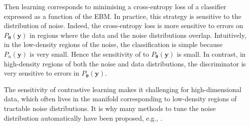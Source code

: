 Then learning corresponds to minimising a cross-entropy loss of a classifier expressed as a function of the EBM. In practice, this strategy is sensitive to the distribution of noise. Indeed, the cross-entropy loss is more sensitive to errors on $P_{\bm{\theta}}(\bm{y})$ in regions where the data and the noise distributions overlap. Intuitively, in the low-density regions of the noise, the classification is simple because $P_n(\mathbf{y})$ is very small. Hence the sensitivity of  to $P_{\bm{\theta}}(\bm{y})$ is small. In contrast, in high-density regions of both the noise and data distributions, the discriminator is very sensitive to errors in $P_{\bm{\theta}}(\bm{y})$.

The sensitivity of contrastive learning makes it challenging for high-dimensional data, which often lives in the manifold corresponding to low-density regions of tractable noise distributions. It is why many methods to tune the noise distribution automatically have been proposed, e.g., \citep{bose2018adversarial, ceylan2018conditional, gao2020flow}.


